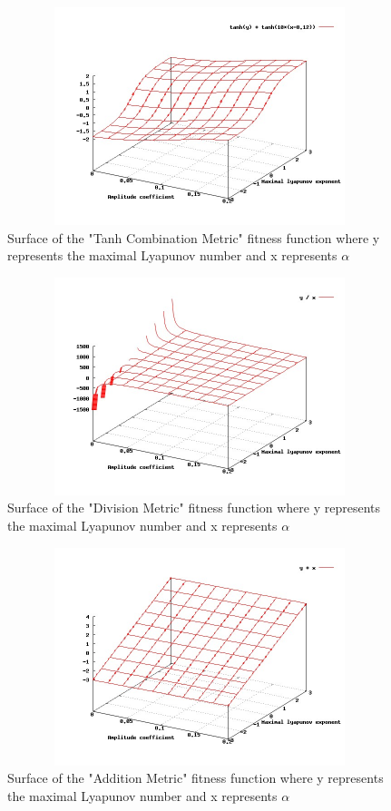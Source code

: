 \documentclass[12pt]{article}
\begin{document}
\begin{figure}[htb]
\begin{center}
\includegraphics[height=2.5in,width=4.5in]{images/fitness_surface3.jpg}
\caption{ Surface of the "Tanh Combination Metric" fitness function where y represents the maximal Lyapunov number and x represents $\alpha$}
\end{center}
\end{figure}
\begin{figure}[htb]
\begin{center}
\includegraphics[height=2.5in,width=4.5in]{images/fitness_surface2.jpg}
\caption{ Surface of the "Division Metric" fitness function where y represents the maximal Lyapunov number and x represents $\alpha$}
\end{center}
\end{figure}
\begin{figure}[htb]
\begin{center}
\includegraphics[height=2.5in,width=4.5in]{images/fitness_surface1.jpg}
\caption{ Surface of the "Addition Metric" fitness function where y represents the maximal Lyapunov number and x represents $\alpha$}
\end{center}
\end{figure}
\clearpage
\end{document}
